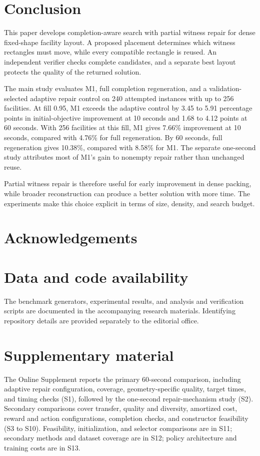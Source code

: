 \documentclass[preprint,12pt,authoryear,nonatbib]{elsarticle}
\begin{document}
\section{Conclusion}
\label{sec:conclusion}

This paper develops completion-aware search with partial witness repair for
dense fixed-shape facility layout. A proposed placement determines which
witness rectangles must move, while every compatible rectangle is reused.
An independent verifier checks complete candidates, and a separate best
layout protects the quality of the returned solution.

The main study evaluates M1, full completion regeneration, and a
validation-selected adaptive repair control on 240 attempted instances with
up to 256 facilities. At fill 0.95, M1 exceeds the adaptive control by
3.45 to 5.91 percentage points in initial-objective improvement at 10 seconds
and 1.68 to 4.12 points at 60 seconds. With 256 facilities at this fill,
M1 gives 7.66\% improvement at 10 seconds, compared with 4.76\% for full
regeneration. By 60 seconds, full regeneration gives 10.38\%, compared with
8.58\% for M1. The separate one-second study attributes most of M1's gain
to nonempty repair rather than unchanged reuse.

Partial witness repair is therefore useful for early improvement in dense
packing, while broader reconstruction can produce a better solution with more
time. The experiments make this choice explicit in terms of size, density,
and search budget.

\ifdefined\CIEAuthorCopy
\section*{Acknowledgements}

\AuthorContributions
\fi

\section*{Data and code availability}
\ifdefined\CIEAuthorCopy

\else
The benchmark generators, experimental results, and analysis and verification
scripts are documented in the accompanying research materials. Identifying
repository details are provided separately to the editorial office.
\fi

\section*{Supplementary material}
The Online Supplement reports the primary 60-second comparison, including
adaptive repair configuration, coverage, geometry-specific quality, target
times, and timing checks (S1), followed by the one-second repair-mechanism
study (S2). Secondary comparisons cover transfer, quality and diversity,
amortized cost, reward and action configurations, completion checks, and
constructor feasibility (S3 to S10). Feasibility, initialization, and selector
comparisons are in S11; secondary methods and dataset coverage are in S12;
policy architecture and training costs are in S13.
\end{document}
